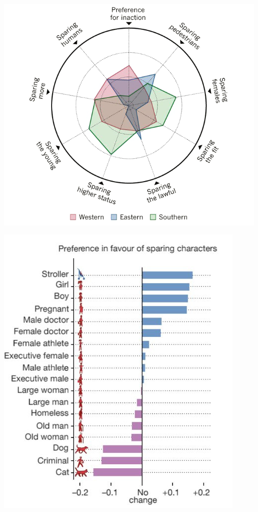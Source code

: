 \documentclass[aspectratio=169,x11names]{beamer}
\begin{document}
\begin{frame}
\begin{multicols}{2}
\begin{center}
\includegraphics[scale=1.25]{images/morals.png} 
\end{center}
\columnbreak

\begin{center}
\includegraphics[scale=1.45]{images/sparing} 
\end{center}
\end{multicols}
\end{frame}
\end{document}
